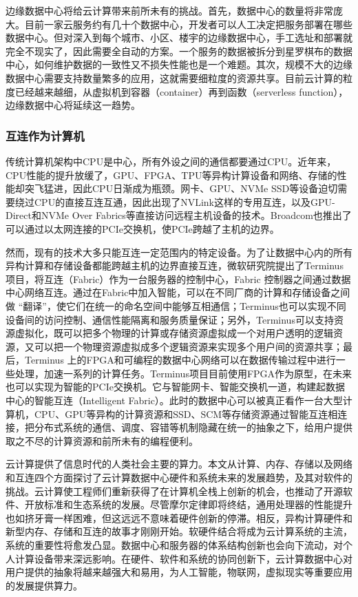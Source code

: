 边缘数据中心将给云计算带来前所未有的挑战。首先，数据中心的数量将非常庞大。目前一家云服务约有几十个数据中心，开发者可以人工决定把服务部署在哪些数据中心。但对深入到每个城市、小区、楼宇的边缘数据中心，手工选址和部署就完全不现实了，因此需要全自动的方案。一个服务的数据被拆分到星罗棋布的数据中心，如何维护数据的一致性又不损失性能也是一个难题。其次，规模不大的边缘数据中心需要支持数量繁多的应用，这就需要细粒度的资源共享。目前云计算的粒度已经越来越细，从虚拟机到容器（container）再到函数（serverless function），边缘数据中心将延续这一趋势。

\subsubsection{互连作为计算机}

传统计算机架构中CPU是中心，所有外设之间的通信都要通过CPU。近年来，CPU性能的提升放缓了，GPU、FPGA、TPU等异构计算设备和网络、存储的性能却突飞猛进，因此CPU日渐成为瓶颈。网卡、GPU、NVMe SSD等设备迫切需要绕过CPU的直接互连互通，因此出现了NVLink这样的专用互连，以及GPU-Direct和NVMe Over Fabrics等直接访问远程主机设备的技术。Broadcom也推出了可以通过以太网连接的PCIe交换机，使PCIe跨越了主机的边界。

然而，现有的技术大多只能互连一定范围内的特定设备。为了让数据中心内的所有异构计算和存储设备都能跨越主机的边界直接互连，微软研究院提出了Terminus项目，将互连（Fabric）作为一台服务器的控制中心，Fabric 控制器之间通过数据中心网络互连。通过在Fabric中加入智能，可以在不同厂商的计算和存储设备之间做 “翻译”，使它们在统一的命名空间中能够互相通信；Terminus也可以实现不同设备间的访问控制、通信性能隔离和服务质量保证；另外，Terminus可以支持资源虚拟化，既可以把多个物理的计算或存储资源虚拟成一个对用户透明的逻辑资源，又可以把一个物理资源虚拟成多个逻辑资源来实现多个用户间的资源共享；最后，Terminus 上的FPGA和可编程的数据中心网络可以在数据传输过程中进行一些处理，加速一系列的计算任务。Terminus项目目前使用FPGA作为原型，在未来也可以实现为智能的PCIe交换机。它与智能网卡、智能交换机一道，构建起数据中心的智能互连（Intelligent Fabric）。此时的数据中心可以被真正看作一台大型计算机，CPU、GPU等异构的计算资源和SSD、SCM等存储资源通过智能互连相连接，把分布式系统的通信、调度、容错等机制隐藏在统一的抽象之下，给用户提供取之不尽的计算资源和前所未有的编程便利。

云计算提供了信息时代的人类社会主要的算力。本文从计算、内存、存储以及网络和互连四个方面探讨了云计算数据中心硬件和系统未来的发展趋势，及其对软件的挑战。云计算使工程师们重新获得了在计算机全栈上创新的机会，也推动了开源软件、开放标准和生态系统的发展。尽管摩尔定律即将终结，通用处理器的性能提升也如挤牙膏一样困难，但这远远不意味着硬件创新的停滞。相反，异构计算硬件和新型内存、存储和互连的故事才刚刚开始。软硬件结合将成为云计算系统的主流，系统的重要性将愈发凸显。数据中心和服务器的体系结构创新也会向下流动，对个人计算设备带来深远影响。在硬件、软件和系统的协同创新下，云计算数据中心对用户提供的抽象将越来越强大和易用，为人工智能，物联网，虚拟现实等重要应用的发展提供算力。



